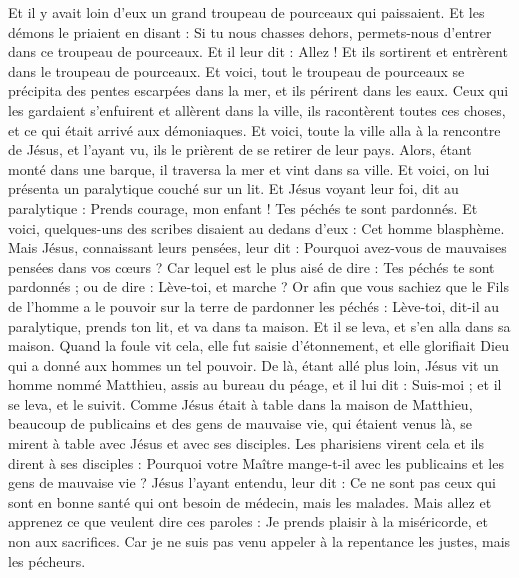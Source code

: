 \begin{multicols}{2}
Et il y avait loin d'eux un grand troupeau de pourceaux qui paissaient.
Et les démons le priaient en disant : Si tu nous chasses dehors, permets-nous d’entrer dans ce troupeau de pourceaux.
Et il leur dit : Allez ! Et ils sortirent et entrèrent dans le troupeau de pourceaux. Et voici, tout le troupeau de pourceaux se précipita des pentes escarpées dans la mer, et ils périrent dans les eaux.
Ceux qui les gardaient s'enfuirent et allèrent dans la ville, ils racontèrent toutes ces choses, et ce qui était arrivé aux démoniaques.
Et voici, toute la ville alla à la rencontre de Jésus, et l'ayant vu, ils le prièrent de se retirer de leur pays.
\VerseOne{}Alors, étant monté dans une barque, il traversa la mer et vint dans sa ville.
Et voici, on lui présenta un paralytique couché sur un lit. Et Jésus voyant leur foi, dit au paralytique : Prends courage, mon enfant ! Tes péchés te sont pardonnés.
Et voici, quelques-uns des scribes disaient au dedans d’eux : Cet homme blasphème.
Mais Jésus, connaissant leurs pensées, leur dit : Pourquoi avez-vous de mauvaises pensées dans vos cœurs ?
Car lequel est le plus aisé de dire : Tes péchés te sont pardonnés ; ou de dire : Lève-toi, et marche ?
Or afin que vous sachiez que le Fils de l'homme a le pouvoir sur la terre de pardonner les péchés : Lève-toi, dit-il au paralytique, prends ton lit, et va dans ta maison.
Et il se leva, et s'en alla dans sa maison.
Quand la foule vit cela, elle fut saisie d’étonnement, et elle glorifiait Dieu qui a donné aux hommes un tel pouvoir.
De là, étant allé plus loin, Jésus vit un homme nommé Matthieu, assis au bureau du péage, et il lui dit : Suis-moi ; et il se leva, et le suivit.
Comme Jésus était à table dans la maison de Matthieu, beaucoup de publicains et des gens de mauvaise vie, qui étaient venus là, se mirent à table avec Jésus et avec ses disciples.
Les pharisiens virent cela et ils dirent à ses disciples : Pourquoi votre Maître mange-t-il avec les publicains et les gens de mauvaise vie ?
Jésus l'ayant entendu, leur dit : Ce ne sont pas ceux qui sont en bonne santé qui ont besoin de médecin, mais les malades.
Mais allez et apprenez ce que veulent dire ces paroles : Je prends plaisir à la miséricorde, et non aux sacrifices. Car je ne suis pas venu appeler à la repentance les justes, mais les pécheurs.

\end{multicols}
